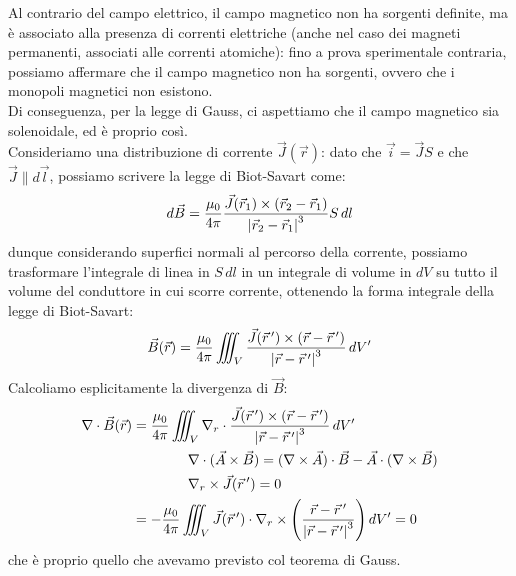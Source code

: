 Al contrario del campo elettrico, il campo magnetico non ha sorgenti definite, ma è associato alla presenza di correnti elettriche (anche nel caso dei magneti permanenti, associati alle correnti atomiche): fino a prova sperimentale contraria, possiamo affermare che il campo magnetico non ha sorgenti, ovvero che i monopoli magnetici non esistono. \\ 
%
Di conseguenza, per la legge di Gauss, ci aspettiamo che il campo magnetico sia solenoidale, ed è proprio così. \\ 
%
Consideriamo una distribuzione di corrente $ \vec{J}(\vec{r}) $: dato che $ \vec{i} = \vec{J} S $ e che $ \vec{J} \parallel d\vec{l} $, possiamo scrivere la legge di Biot-Savart come:
\begin{equation}
	d\vec{B} = \displaystyle\frac{\mu_0}{4\pi} \displaystyle\frac{\vec{J}(\vec{r}_1) \times (\vec{r}_2 - \vec{r}_1)}{\left\lvert\vec{r}_2 - \vec{r}_1\right\rvert^3} S \, dl 
	\label{eq:bio-savart-2}
\end{equation}
dunque considerando superfici normali al percorso della corrente, possiamo trasformare l'integrale di linea in $ S\,dl $ in un integrale di volume in $ dV $ su tutto il volume del conduttore in cui scorre corrente, ottenendo la forma integrale della legge di Biot-Savart:
\begin{equation}
	\vec{B}(\vec{r}) = \displaystyle\frac{\mu_0}{4\pi} \iiint_V \displaystyle\frac{\vec{J}(\vec{r}\,') \times (\vec{r} - \vec{r}\,')}{\left\lvert\vec{r} - \vec{r}\,'\right\rvert^3} \, dV'
	\label{eq:bio-savart-int}
\end{equation}
Calcoliamo esplicitamente la divergenza di $ \vec{B} $:
\begin{equation}
	\begin{split}
		\nabla\cdot\vec{B}(\vec{r}) &= \displaystyle\frac{\mu_0}{4\pi} \iiint_V \nabla_r \cdot \displaystyle\frac{\vec{J}(\vec{r}\,') \times (\vec{r} - \vec{r}\,')}{\left\lvert\vec{r} - \vec{r}\,'\right\rvert^3} \, dV' \\ 
				      & \qquad\qquad \nabla\cdot (\vec{A}\times\vec{B}) = (\nabla\times\vec{A})\cdot\vec{B} - \vec{A}\cdot (\nabla\times\vec{B}) \\ 
				      & \qquad\qquad \nabla_r \times\vec{J}(\vec{r}\,') = 0 \\ 
				      &= -\displaystyle\frac{\mu_0}{4\pi} \iiint_V \vec{J}(\vec{r}\,') \cdot \nabla_r \times \left(\displaystyle\frac{\vec{r} - \vec{r}\,'}{\left\lvert\vec{r} - \vec{r}\,'\right\rvert^3}\right) dV' = 0
	\end{split}
	\label{eq:}
\end{equation}
che è proprio quello che avevamo previsto col teorema di Gauss.

